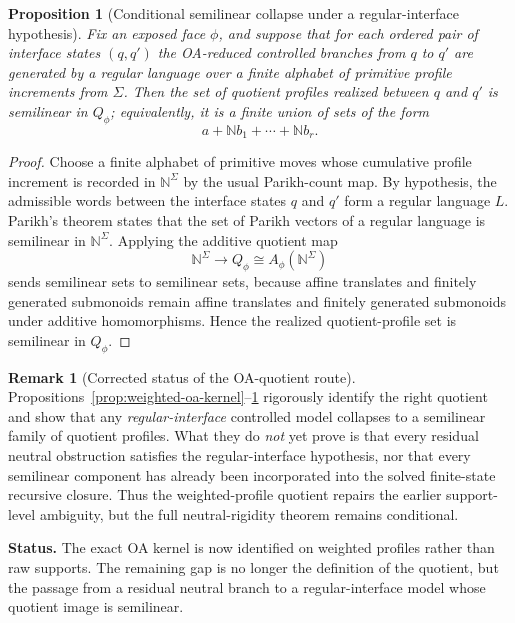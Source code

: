 \documentclass[11pt]{article}
\newtheorem{proposition}[theorem]{Proposition}
\theoremstyle{definition}
\newtheorem{remark}[theorem]{Remark}
\newcommand{\N}{\mathbb{N}}
\newcommand{\1}{\mathbf{1}}
\newcommand{\status}[1]{\par\smallskip\noindent\textbf{Status.} #1\par\smallskip}
\begin{document}
\begin{proposition}[Conditional semilinear collapse under a regular-interface hypothesis]\label{prop:weighted-oa-semilinear}
Fix an exposed face $\phi$, and suppose that for each ordered pair of interface states $(q,q')$ the OA-reduced controlled branches from $q$ to $q'$ are generated by a regular language over a finite alphabet of primitive profile increments from $\Sigma$. Then the set of quotient profiles realized between $q$ and $q'$ is semilinear in $Q_\phi$; equivalently, it is a finite union of sets of the form
\[
a+\N b_1+\cdots+\N b_r.
\]
\end{proposition}

\begin{proof}
Choose a finite alphabet of primitive moves whose cumulative profile increment is recorded in $\N^\Sigma$ by the usual Parikh-count map. By hypothesis, the admissible words between the interface states $q$ and $q'$ form a regular language $L$. Parikh's theorem states that the set of Parikh vectors of a regular language is semilinear in $\N^\Sigma$. Applying the additive quotient map
\[
\N^\Sigma \longrightarrow Q_\phi\cong A_\phi(\N^\Sigma)
\]
sends semilinear sets to semilinear sets, because affine translates and finitely generated submonoids remain affine translates and finitely generated submonoids under additive homomorphisms. Hence the realized quotient-profile set is semilinear in $Q_\phi$.
\end{proof}

\begin{remark}[Corrected status of the OA-quotient route]\label{rem:weighted-oa-status}
Propositions~\ref{prop:weighted-oa-kernel}--\ref{prop:weighted-oa-semilinear} rigorously identify the right quotient and show that any \emph{regular-interface} controlled model collapses to a semilinear family of quotient profiles. What they do \emph{not} yet prove is that every residual neutral obstruction satisfies the regular-interface hypothesis, nor that every semilinear component has already been incorporated into the solved finite-state recursive closure. Thus the weighted-profile quotient repairs the earlier support-level ambiguity, but the full neutral-rigidity theorem remains conditional.
\end{remark}

\status{The exact OA kernel is now identified on weighted profiles rather than raw supports. The remaining gap is no longer the definition of the quotient, but the passage from a residual neutral branch to a regular-interface model whose quotient image is semilinear.}
\end{document}
